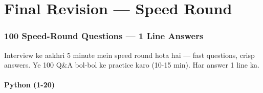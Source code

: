 \newpage

\part{Final Revision --- Speed Round}

\section{100 Speed-Round Questions --- 1 Line Answers}

\begin{conceptbox}
Interview ke aakhri 5 minute mein speed round hota hai --- fast questions, crisp answers. Ye 100 Q\&A bol-bol ke practice karo (10-15 min). Har answer 1 line ka.
\end{conceptbox}

\subsection{Python (1-20)}

